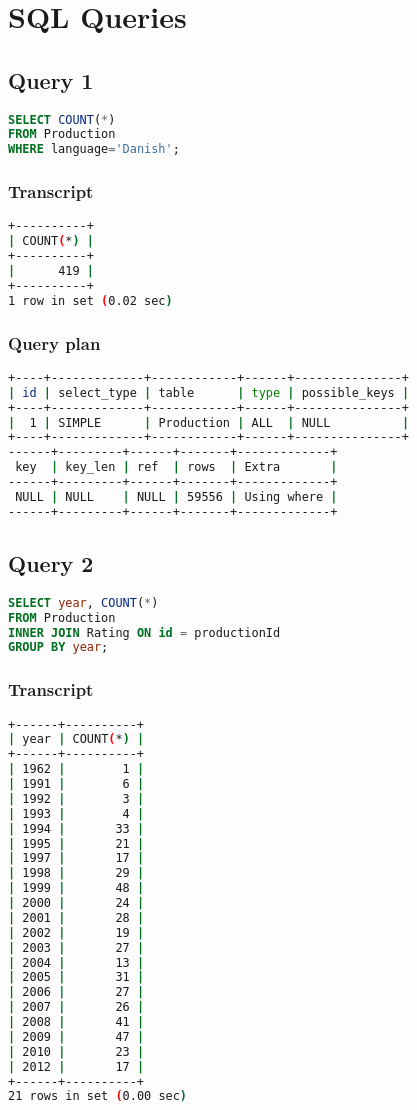 \lstset{
	basicstyle=\tiny
}

\section{SQL Queries}
\subsection{Query 1}
\begin{lstlisting}[language=sql]
SELECT COUNT(*)
FROM Production
WHERE language='Danish';
\end{lstlisting}

\subsubsection{Transcript}
\begin{lstlisting}[language=bash]
+----------+
| COUNT(*) |
+----------+
|      419 |
+----------+
1 row in set (0.02 sec)
\end{lstlisting}

\subsubsection{Query plan}
\begin{lstlisting}[language=bash]
+----+-------------+------------+------+---------------+
| id | select_type | table      | type | possible_keys |
+----+-------------+------------+------+---------------+
|  1 | SIMPLE      | Production | ALL  | NULL          |
+----+-------------+------------+------+---------------+
------+---------+------+-------+-------------+
 key  | key_len | ref  | rows  | Extra       |
------+---------+------+-------+-------------+
 NULL | NULL    | NULL | 59556 | Using where |
------+---------+------+-------+-------------+
\end{lstlisting}


\bigskip
\subsection{Query 2}
\begin{lstlisting}[language=sql]
SELECT year, COUNT(*)
FROM Production
INNER JOIN Rating ON id = productionId
GROUP BY year;
\end{lstlisting}

\subsubsection{Transcript}
\begin{lstlisting}[language=bash]
+------+----------+
| year | COUNT(*) |
+------+----------+
| 1962 |        1 |
| 1991 |        6 |
| 1992 |        3 |
| 1993 |        4 |
| 1994 |       33 |
| 1995 |       21 |
| 1997 |       17 |
| 1998 |       29 |
| 1999 |       48 |
| 2000 |       24 |
| 2001 |       28 |
| 2002 |       19 |
| 2003 |       27 |
| 2004 |       13 |
| 2005 |       31 |
| 2006 |       27 |
| 2007 |       26 |
| 2008 |       41 |
| 2009 |       47 |
| 2010 |       23 |
| 2012 |       17 |
+------+----------+
21 rows in set (0.00 sec)
\end{lstlisting}

